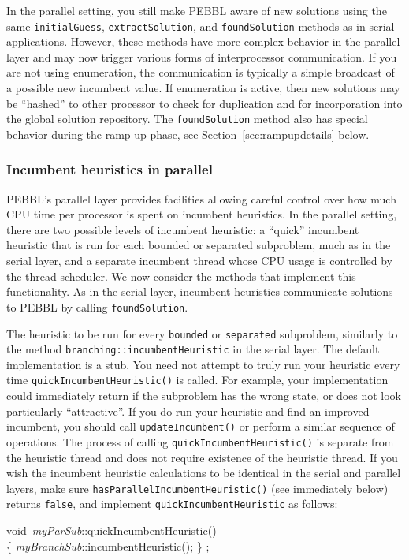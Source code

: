 In the parallel setting, you still make PEBBL aware of new solutions
using the same \texttt{initialGuess}, \texttt{extractSolution}, and
\texttt{foundSolution} methods as in serial applications.  However,
these methods have more complex behavior in the parallel layer and
may now trigger various forms of interprocessor communication.  If you
are not using enumeration, the communication is typically a simple broadcast of
a possible new incumbent value.  If enumeration is active, then
new solutions may be ``hashed'' to other processor to check for
duplication and for incorporation into the global solution repository.
The \texttt{foundSolution} method also has special behavior during the
ramp-up phase, see Section~\ref{sec:rampupdetails} below.


\subsubsection{Incumbent heuristics in parallel}
PEBBL's parallel layer provides facilities allowing careful control
over how much CPU time per processor is spent on incumbent
heuristics.  In the parallel setting, there are two possible levels of
incumbent heuristic: a ``quick'' incumbent heuristic that is run for
each bounded or separated 
subproblem, much as in the serial layer, and a separate
incumbent thread whose CPU usage is controlled by the thread
scheduler.  We now consider the methods that implement this
functionality.  As in the serial layer, incumbent heuristics
communicate solutions to PEBBL by calling \texttt{foundSolution}.

 The
heuristic to be run for every \texttt{bounded} or \texttt{separated}
subproblem, similarly to the method 
\texttt{branching::incumbentHeuristic} in the
serial layer.  The default implementation is a stub.  You need not
attempt to truly run your heuristic every time
\texttt{quickIncumbentHeuristic()} is called.  For example, your
implementation could immediately return if the subproblem has the
wrong state, or does not look particularly ``attractive''.  If you do
run your heuristic and find an improved incumbent, you should call
\texttt{updateIncumbent()} or perform a similar sequence of
operations.  The process of calling \texttt{quickIncumbentHeuristic()}
is separate from the heuristic thread and does not require existence
of the heuristic thread.  If you wish the incumbent heuristic
calculations to be identical in the serial and parallel layers, make
sure \texttt{hasParallelIncumbentHeuristic()} (see immediately below)
returns \texttt{false}, and implement \texttt{quickIncumbentHeuristic}
as follows:
\begin{codeblock}
void\=~\textit{myParSub}::quickIncumbentHeuristic() \\
\> \{ \textit{myBranchSub}::incumbentHeuristic(); \} ;
\end{codeblock}

